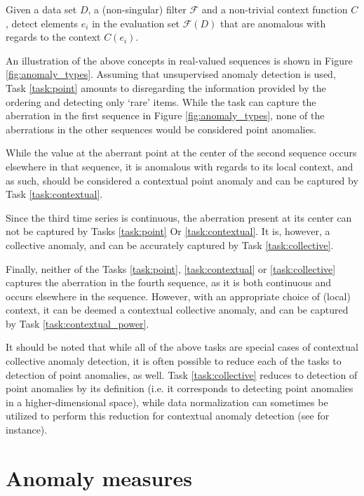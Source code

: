 \begin{task}
  \label{task:contextual_power}
  Given a data set $D$, a (non-singular) filter $\mathcal{F}$ and a non-trivial context function $C$, detect elements $e_i$ in the evaluation set $\mathcal{F}(D)$ that are anomalous with regards to the context $C(e_i)$.
\end{task}

An illustration of the above concepts in real-valued sequences is shown in Figure \ref{fig:anomaly_types}. Assuming that unsupervised anomaly detection is used, Task \ref{task:point} amounts to disregarding the information provided by the ordering and detecting only `rare' items. While the task can capture the aberration in the first sequence in Figure \ref{fig:anomaly_types}, none of the aberrations in the other sequences would be considered point anomalies.

While the value at the aberrant point at the center of the second sequence occurs elsewhere in that sequence, it is anomalous with regards to its local context, and as such, should be considered a contextual point anomaly and can be captured by Task \ref{task:contextual}.

Since the third time series is continuous, the aberration present at its center can not be captured by Tasks \ref{task:point} Or \ref{task:contextual}. It is, however, a collective anomaly, and can be accurately captured by Task \ref{task:collective}.

Finally, neither of the Tasks \ref{task:point}, \ref{task:contextual} or \ref{task:collective} captures the aberration in the fourth sequence, as it is both continuous and occurs elsewhere in the sequence. However, with an appropriate choice of (local) context, it can be deemed a contextual collective anomaly, and can be captured by Task \ref{task:contextual_power}.

It should be noted that while all of the above tasks are special cases of contextual collective anomaly detection, it is often possible to reduce each of the tasks to detection of point anomalies, as well. Task \ref{task:collective} reduces to detection of point anomalies by its definition (i.e. it corresponds to detecting point anomalies in a higher-dimensional space), while data normalization can sometimes be utilized to perform this reduction for contextual anomaly detection (see \cite{meckesheimer} for instance).

\section{Anomaly measures}
\label{sect:anomaly_measures}

